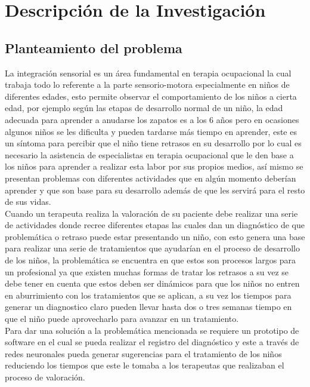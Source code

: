 \chapter{Descripción de la Investigación}
\section{Planteamiento del problema}
	La  integración  sensorial  es  un  área  fundamental  en  terapia  ocupacional  la cual trabaja  todo  lo  referente  a  la  parte  sensorio-motora  especialmente  en  niños  de diferentes edades,  esto  permite  observar  el  comportamiento de  los  niños  a  cierta edad,  por  ejemplo  según  las  etapas  de  desarrollo  normal  de  un  niño,  la  edad adecuada para aprender a anudarse los zapatos es a los 6 años pero en ocasiones algunos niños se les dificulta y pueden tardarse más tiempo en aprender, este es un síntoma para percibir que el niño tiene retrasos en su desarrollo por lo cual es necesario la asistencia de especialistas en terapia ocupacional que le den base a los niños para aprender a realizar esta labor por sus propios medios, así mismo se presentan  problemas  con  diferentes  actividades  que  en  algún  momento  deberían aprender y que son base para su desarrollo además de que les servirá para el resto de sus vidas.\\
	Cuando un terapeuta realiza la valoración de su paciente debe realizar una serie de actividades  donde  recree  diferentes  etapas  las  cuales dan  un  diagnóstico  de  que problemática o retraso puede estar presentando un niño, con esto genera una base para realizar una serie de tratamientos que ayudarían en el proceso de desarrollo de los niños, la problemática se encuentra en que estos son procesos largos para un profesional ya que existen muchas formas de tratar los retrasos a su vez se debe tener  en  cuenta  que  estos  deben  ser  dinámicos  para  que  los  niños  no  entren  en aburrimiento con los tratamientos que se aplican, a su vez los tiempos para generar un diagnostico claro pueden llevar hasta dos o tres semanas tiempo en que el niño puede aprovecharlo para avanzar en un tratamiento.\\
	Para  dar  una  solución  a  la  problemática  mencionada  se  requiere  un  prototipo  de software en el cual se pueda realizar el registro del diagnóstico y este a través de redes  neuronales pueda  generar  sugerencias  para  el  tratamiento  de  los  niños reduciendo  los  tiempos  que  este  le  tomaba  a  los  terapeutas  que  realizaban  el proceso de valoración.
